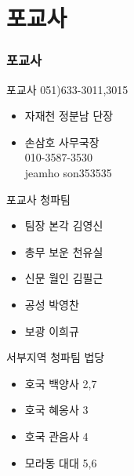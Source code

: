 \documentclass[aspectratio=1610,20pt,xcolor=pdftex,dvipsnames,table,handout]{beamer}
\begin{document}
		\section{포교사}
		\begin{frame} [t,plain]
		\frametitle{포교사}

			\begin{block} {포교사 051)633-3011,3015}
			\setlength{\leftmargini}{1em}			
			\begin{itemize}
				\item 자재천 정분남 단장 	\hrulefill
				\item 손삼호 사무국장 \\ 010-3587-3530 \\ jeamho son353535
			\end{itemize}
			\end{block}						


			\begin{block} {포교사 청파팀 }
			\setlength{\leftmargini}{1em}			
			\begin{itemize}
				\item 팀장 본각 김영신 	\hrulefill
				\item 총무 보운 천유실 	\hrulefill
				\item 신문 월인 김필근 	\hrulefill
				\item 공성 박영찬 	\hrulefill
				\item 보광 이희규	\hrulefill

			\end{itemize}
			\end{block}						

			\begin{block} {서부지역 청파팀 법당}
			\setlength{\leftmargini}{1em}			
			\begin{itemize}
				\item 호국 백양사 2,7 	\hrulefill
				\item 호국 혜옹사 3 	\hrulefill
				\item 호국 관음사 4 	\hrulefill
				\item 모라동 대대 5,6 	\hrulefill
			\end{itemize}
			\end{block}						


		\end{frame}					


\end{document}
